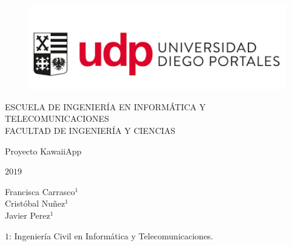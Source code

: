 \documentclass[Article, letterpaper,12pt]{article}
\author{totito del boom}
\begin{document}
\sloppy

\begin{titlepage}

\begin{center}
\vspace*{-1in}
\begin{figure}[htb]
\begin{center}
\includegraphics[width=15cm]{udplogo.png}
\end{center}
\end{figure}


ESCUELA DE INGENIERÍA EN INFORMÁTICA Y TELECOMUNICACIONES\\
\vspace*{0.25in}
FACULTAD DE INGENIERÍA Y CIENCIAS\\
\vspace*{0.25in}

\vspace*{0.3in}
\begin{large}
\begin{Huge}
Proyecto KawaiiApp
\end{Huge}
\vspace{10pt}
   
\end{large}

\vspace*{0.4in}
\begin{large}
\begin{center}
\begin{huge}
$2019$
\end{huge}
\end{center}
\end{large}
\vspace*{0.4in}
\begin{large}
 Francisca Carrasco$^1$
\\
Cristóbal Nuñez$^1$
\\
Javier Perez$^1$
\\
\begin{small}
$1$: Ingeniería Civil en Informática y Telecomunicaciones.\\




\end{small}
\end{large}
\end{center}
\end{titlepage}
\end{document}

